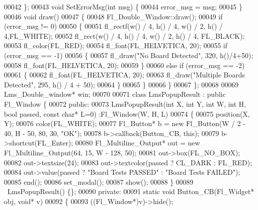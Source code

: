 \begin{DoxyCode}
00042     \};
00043     \textcolor{keywordtype}{void} SetErrorMsg(\textcolor{keywordtype}{int} msg) \{
00044         error\_msg = msg;
00045     \}
00046     \textcolor{keywordtype}{void} draw()
00047     \{
00048         Fl\_Double\_Window::draw();
00049         \textcolor{keywordflow}{if} (error\_msg != 0)
00050         \{
00051             fl\_rectf(w() / 4, h() / 4, w() / 2, h() / 4,FL\_WHITE);
00052             fl\_rect(w() / 4, h() / 4, w() / 2, h() / 4, FL\_BLACK);
00053             fl\_color(FL\_RED);
00054             fl\_font(FL\_HELVETICA, 20);
00055             \textcolor{keywordflow}{if} (error\_msg == -1)
00056             \{
00057                 fl\_draw(\textcolor{stringliteral}{"No Board Detected"}, 320, h()/4+50);
00058                 fl\_font(FL\_HELVETICA, 20);
00059             \}
00060             \textcolor{keywordflow}{else} \textcolor{keywordflow}{if} (error\_msg == -2)
00061             \{
00062                 fl\_font(FL\_HELVETICA, 20);
00063                 fl\_draw(\textcolor{stringliteral}{"Multiple Boards Detected"}, 295, h() / 4 + 50);
00064             \}
00065         \}
00066     \}
00067 \};
00068 
00069 Lms\_Double\_window* win;
00070 
00071 \textcolor{keyword}{class }LmsPopupResult : \textcolor{keyword}{public} Fl\_Window \{
00072 \textcolor{keyword}{public}:
00073     LmsPopupResult(\textcolor{keywordtype}{int} X, \textcolor{keywordtype}{int} Y, \textcolor{keywordtype}{int} W, \textcolor{keywordtype}{int} H, \textcolor{keywordtype}{bool} passed, \textcolor{keyword}{const} \textcolor{keywordtype}{char}* L=0) :Fl\_Window(W, H, 
      L)
00074     \{
00075         position(X, Y);
00076         color(FL\_WHITE);
00077         Fl\_Button* b = \textcolor{keyword}{new} Fl\_Button(W / 2 - 40, H - 50, 80, 30, \textcolor{stringliteral}{"OK"});
00078         b->callback(Button\_CB, \textcolor{keyword}{this});
00079         b->shortcut(FL\_Enter);
00080         Fl\_Multiline\_Output* out = \textcolor{keyword}{new} Fl\_Multiline\_Output(64, 15, W - 128, 50);
00081         out->box(FL\_NO\_BOX);
00082         out->textsize(24);
00083         out->textcolor(passed ? CL\_DARK : FL\_RED);
00084         out->value(passed ? \textcolor{stringliteral}{"Board Tests PASSED"} : \textcolor{stringliteral}{"Board Tests FAILED"});
00085         end();
00086         set\_modal();
00087         show();
00088     \}
00089     ~LmsPopupResult() \{\};
00090 \textcolor{keyword}{private}:
00091     \textcolor{keyword}{static} \textcolor{keywordtype}{void} Button\_CB(Fl\_Widget* obj, \textcolor{keywordtype}{void}* v)
00092     \{
00093         ((Fl\_Window*)v)->hide();

\end{DoxyCode}
